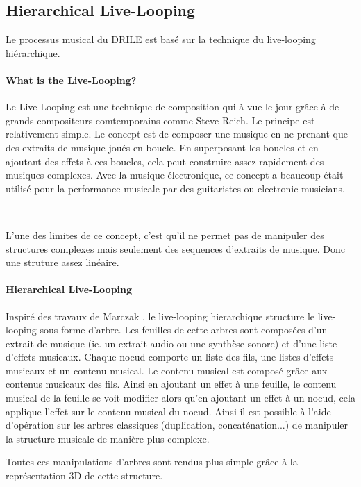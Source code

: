 \subsection{Hierarchical Live-Looping}

Le processus musical du DRILE est basé sur la technique du live-looping hiérarchique.

\paragraph{What is the Live-Looping?}
Le Live-Looping est une technique de composition qui à vue le jour grâce à de grands compositeurs comtemporains comme Steve Reich.
Le principe est relativement simple. Le concept est de composer une musique en ne prenant que des extraits de musique joués en boucle. En superposant les boucles et en ajoutant des effets à ces boucles, cela peut construire assez rapidement des musiques complexes.
Avec la musique électronique, ce concept a beaucoup était utilisé pour la performance musicale par des guitaristes ou electronic musicians.

~

L'une des limites de ce concept, c'est qu'il ne permet pas de manipuler des structures complexes mais seulement des sequences d'extraits de musique. Donc une struture assez linéaire.

\paragraph{Hierarchical Live-Looping}

Inspiré des travaux de Marczak \cite{marczak2007etude}, le live-looping hierarchique structure le live-looping sous forme d'arbre. Les feuilles de cette arbres sont composées d'un extrait de musique (ie. un extrait audio ou une synthèse sonore) et d'une liste d'effets musicaux. Chaque noeud comporte un liste des fils, une listes d'effets musicaux et un contenu musical. Le contenu musical est composé grâce aux contenus musicaux des fils.
Ainsi en ajoutant un effet à une feuille, le contenu musical de la feuille se voit modifier alors qu'en ajoutant un effet à un noeud, cela applique l'effet sur le contenu musical du noeud. Ainsi il est possible à l'aide d'opération sur les arbres classiques (duplication, concaténation...) de manipuler la structure musicale de manière plus complexe.

Toutes ces manipulations d'arbres sont rendus plus simple grâce à la représentation 3D de cette structure.

